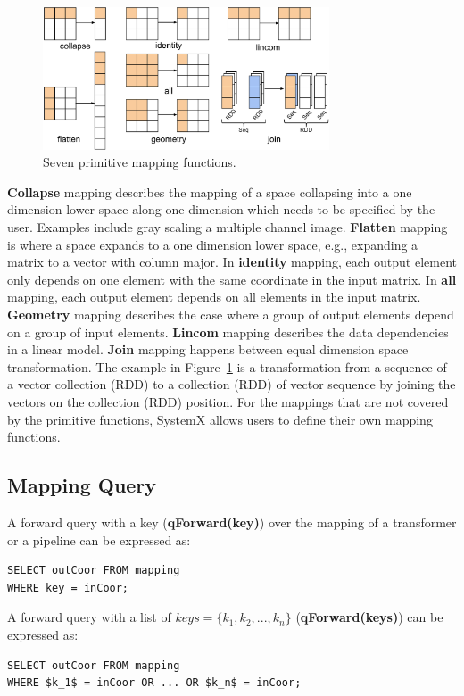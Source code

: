 \documentclass{sig-alternate}
\begin{document}
\begin{figure}[t]
\begin{center}
    \includegraphics[width=85mm]{pictures/narrowmapping}
\caption {Seven primitive mapping functions.
    \label{fig:narrowmapping}
}
\end{center}
\end{figure}

{\bf Collapse} mapping describes the mapping of a space collapsing into a one dimension lower space along one dimension which needs
to be specified by the user. Examples include gray scaling a multiple channel image.
{\bf Flatten} mapping is where a space expands to a one dimension lower space, e.g., expanding a matrix to a vector with column major.
In {\bf identity} mapping, each output element only depends on one element with the same coordinate in the input matrix.
In {\bf all} mapping, each output element depends on all elements in the input matrix.
{\bf Geometry} mapping describes the case where a group of output elements depend on a group of input elements.
{\bf Lincom} mapping describes the data dependencies in a linear model.
{\bf Join} mapping happens between equal dimension space transformation. The example in Figure~\ref{fig:narrowmapping} 
is a transformation from a sequence of a vector collection (RDD) to a collection (RDD) of vector sequence by joining the vectors
on the collection (RDD) position.
For the mappings that are not covered by the primitive functions, SystemX allows users to define their own mapping functions.

\subsection{Mapping Query}
A forward query with a key  ({\bf qForward(key)}) over the mapping of a transformer or a pipeline can be expressed as:
\begin{lstlisting}
SELECT outCoor FROM mapping
WHERE key = inCoor;
\end{lstlisting}

A forward query with a list of $keys=\{k_1, k_2, ..., k_n\}$ ({\bf qForward(keys)}) can be expressed as:
\begin{lstlisting}
SELECT outCoor FROM mapping
WHERE $k_1$ = inCoor OR ... OR $k_n$ = inCoor;
\end{lstlisting}
\end{document}
